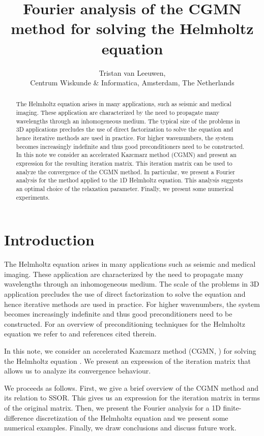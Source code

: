 \documentclass{article}
\begin{document}
\title{Fourier analysis of the CGMN method for solving the Helmholtz equation}
\author{Tristan van Leeuwen,\\ {\small Centrum Wiskunde \& Informatica, Amsterdam, The Netherlands}}
\maketitle
\begin{abstract}
The Helmholtz equation arises in many applications, such as seismic and medical imaging.
These application are characterized by the need to propagate many
wavelengths through an inhomogeneous medium. The typical size of the problems in 3D applications
precludes the use of direct factorization to solve the equation and hence iterative methods are used in practice.
For higher wavenumbers, the system becomes increasingly indefinite and thus good preconditioners
need to be constructed. 
In this note we consider an accelerated Kazcmarz method (CGMN) 
and present an expression for the resulting iteration matrix.
This iteration matrix can be used to analyze the convergence of the CGMN method.
In particular, we present a Fourier analysis for the method applied to the 1D Helmholtz equation.
This analysis suggests an optimal choice of the relaxation parameter.
Finally, we present some numerical experiments.
\end{abstract}

\section{Introduction}
The Helmholtz equation arises in many applications such as seismic and medical imaging.
These application are characterized by the need to propagate many
wavelengths through an inhomogeneous medium. The scale of the problems in 3D application precludes the use
of direct factorization to solve the equation and hence iterative methods are used in practice.
For higher wavenumbers, the system becomes increasingly indefinite and thus good preconditioners
need to be constructed. For an overview of preconditioning techniques for the Helmholtz equation 
we refer to \cite{ernst11} and references cited therein.

In this note, we consider an accelerated Kazcmarz method (CGMN, \cite{Bjorck1979}) 
for solving the Helmholtz equation \cite{Gordon2013}. We present an expression of 
the iteration matrix that allows us to analyze its convergence behaviour.

We proceeds as follows.
First, we give a brief overview of the CGMN method and its relation to SSOR. 
This gives us an expression for the iteration matrix in terms of the original matrix.
Then, we present the Fourier
analysis for a 1D finite-difference discretization of the Helmholtz equation and 
we present some numerical examples. Finally, we draw conclusions and discuss future work.
\end{document}
